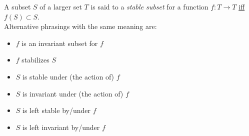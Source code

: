 \documentclass[12pt]{article}
\begin{document}
A subset $S$ of a larger set $T$ is said to a \emph{stable subset} for a function $f: T\to T$ \underline{iff} $f(S)\subset S$.\\
Alternative phrasings with the same meaning are:
\begin{itemize}
\item $f$ is an invariant subset for $f$
\item $f$ stabilizes $S$
\item $S$ is stable under (the action of) $f$
\item $S$ is invariant under (the action of) $f$
\item $S$ is left stable by/under $f$
\item $S$ is left invariant by/under $f$
\end{itemize}
\end{document}
